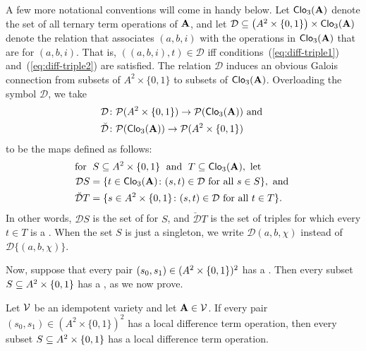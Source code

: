 
\newcommand\dtrel{\ensuremath{\mathrel{\mathcal{D}}}}
\newcommand\dtr{\ensuremath{\mathcal{D}}}
A few more notational conventions will come in handy below.
Let $\operatorname{\mathsf{Clo}}_3(\mathbf{A})$ denote the set of all ternary term operations of $\mathbf{A}$,
and let
$\dtr \subseteq \bigl(A^2\times \{0,1\}\bigr) \times \Clo_3(\alg{A})$
denote the relation that associates $(a, b, i)$
with the operations in $\operatorname{\mathsf{Clo}}_3(\mathbf{A})$ that are \ldtos for
$(a, b, i)$.  That is,
$((a,b,i), t) \in \dtr$ iff conditions~(\ref{eq:diff-triple1})
and~(\ref{eq:diff-triple2}) are satisfied.
The relation $\dtr$ induces an obvious Galois connection
from subsets of $A^2\times \{0,1\}$ to subsets
of $\operatorname{\mathsf{Clo}}_3(\mathbf{A})$.  Overloading the symbol $\dtr$,
we take
\begin{align*}
\dtr &\colon \sP(A^2 \times \{0,1\}) \to \sP(\Clo_3(\alg{A})) \text{ and }\\
\breve{\dtr} &\colon \sP(\Clo_3(\alg{A})) \to \sP(A^2\times \{0,1\})
\end{align*}
to be the maps defined as follows:
\begin{align*}
  \text{for }& \;  S \subseteq A^2 \times \{0,1\}\; \text{ and } \;T \subseteq \Clo_3(\alg{A}),
  \text{ let }\\
  \dtr S &= \{t \in \Clo_3(\alg{A}) \colon (s,t) \in \dtr \text{ for all } s \in S\}, \text{ and }\\
  \breve{\dtr} T &= \{s \in A^2 \times \{0,1\} \colon (s,t) \in \dtr \text{ for all } t \in T\}.
\end{align*}
In other words, $\dtr S$ is the set of \ldtos
for $S$, and $\breve{\dtr} T$ is the set of triples for which every $t\in T$
is a \ldto.  When the set $S$ is just a singleton, we write
$\dtr (a,b,\chi)$ instead of $\dtr \{(a,b,\chi)\}$.

Now, suppose that every pair
$(s_0, s_1)\in (A^2 \times \{0,1\})^2$ %
has a \ldto.
Then every subset $S\subseteq A^2 \times \{0,1\}$
has a \ldto, as we now prove.

\begin{theorem} %
  \label{thm:local-diff-terms}
  Let $\mathcal{V}$ be an idempotent variety and let
  $\mathbf{A}  \in \mathcal{V}$. %
  If every pair
  $(s_0, s_1) \in (A^2 \times \{0,1\})^2$
  has a local difference term operation, then
  every subset $S \subseteq A^2 \times \{0,1\}$
  has a local difference term operation.
\end{theorem}


